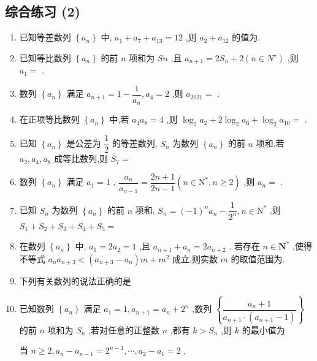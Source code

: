 \subsection*{综合练习 (2)}
\begin{enumerate}
    \item 已知等差数列 $\left\{  {a}_{n}\right\}$ 中, ${a}_{1} + {a}_{7} + {a}_{13} = {12}$ ,则 ${a}_{2} + {a}_{12}$ 的值为.
    \item 已知等比数列 $\left\{  {a}_{n}\right\}$ 的前 $n$ 项和为 ${Sn}$ ,且 ${a}_{n + 1} = 2{S}_{n} + 2\left( {n \in  {N}^{ \star  }}\right)$ ,则 ${a}_{1} =$ .
    \item 数列 $\left\{  {a}_{n}\right\}$ 满足 ${a}_{n + 1} = 1 - \dfrac{1}{{a}_{n}},{a}_{4} = 2$ ,则 ${a}_{2021} =$ .
    \item 在正项等比数列 $\left\{  {a}_{n}\right\}$ 中,若 ${a}_{4}{a}_{8} = 4$ ,则 ${\log }_{2}{a}_{2} + 2{\log }_{2}{a}_{6} + {\log }_{2}{a}_{10} =$ .
    \item 已知 $\left\{  {a}_{n}\right\}$ 是公差为 $\dfrac{1}{2}$ 的等差数列, ${S}_{n}$ 为数列 $\left\{  {a}_{n}\right\}$ 的前 $n$ 项和,若 ${a}_{2},{a}_{4},{a}_{8}$ 成等比数列,则 ${S}_{7} =$
    \item 数列 $\left\{  {a}_{n}\right\}$ 满足 ${a}_{1} = 1$ , $\dfrac{{a}_{n}}{{a}_{n - 1}} = \dfrac{{2n} + 1}{{2n} - 1}\left( {n \in  {\mathrm{N}}^{ * },n \geq  2}\right)$ ,则 ${a}_{n} =$ . 
    \item 已知 ${S}_{n}$ 为数列 $\left\{  {a}_{n}\right\}$ 的前 $n$ 项和, ${S}_{n} = {\left( -1\right) }^{n}{a}_{n} - \dfrac{1}{{2}^{n}},n \in  {\mathrm{N}}^{ * }$ ,则 ${S}_{1} + {S}_{2} + {S}_{3} + {S}_{4} + {S}_{5} =$ 
    \item 在数列 $\left\{  {a}_{n}\right\}$ 中, ${a}_{1} = 2{a}_{2} = 1$ ,且 ${a}_{n + 1} + {a}_{n} = 2{a}_{n + 2}$ . 若存在 $n \in  {\mathbf{N}}^{ * }$ ,使得不等式 ${a}_{n}{a}_{n + 3} < \left( {{a}_{n + 3} - {a}_{n}}\right) m + {m}^{2}$ 成立,则实数 $m$ 的取值范围为.
    \item 下列有关数列的说法正确的是 
    \item 已知数列 $\left\{  {a}_{n}\right\}$ 满足 ${a}_{1} = 1,{a}_{n + 1} = {a}_{n} + {2}^{n}$ ,数列 $\left\{  \dfrac{{a}_{n} + 1}{{a}_{n + 1} \cdot  \left( {{a}_{n + 1} - 1}\right) }\right\}$ 的前 $n$ 项和为 ${S}_{n}$ ,若对任意的正整数 $n$ ,都有 $k > {S}_{n}$ ,则 $k$ 的最小值为  
    \begin{jieda}
        当 $n \geq  2,{a}_{n} - {a}_{n - 1} = {2}^{n - 1},\cdots ,{a}_{2} - {a}_{1} = 2$ ,
        

\end{jieda}
\end{enumerate}
